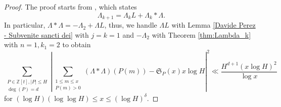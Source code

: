 \documentclass[reqno, 11pt]{amsart}
\numberwithin{equation}{section}
\theoremstyle{definition}
\newcommand{\0}{\mathbf{0}}
\renewcommand{\leq}{\leqslant}
\renewcommand{\P}{\mathbb{P}}
\renewcommand{\leq}{\leqslant}
\renewcommand{\#}{\sharp}
\begin{document}
\begin{proof}The proof starts from \cite[Equation 3.15]{MR2647984}, which states$$ \Lambda_{k+1}=\Lambda_k L+ \Lambda_k \ast \Lambda.$$
In particular, $\Lambda \ast \Lambda=- \Lambda_{2}+\Lambda L$, thus, we handle $\Lambda L$ with 
Lemma \ref{Davide Perez - Subvenite sancti dei} with $j=k=1$ and $- \Lambda_{2}$ with Theorem \ref{thm:Lambda_k} with $n=1,k_1=2$  
to obtain \begin{equation} \label{Abel17} \sum_{\substack{ P\in \mathbb Z[t],|P|\leq H \\  \deg(P)=d}} \left|
\sum_{\substack{1\leq m\leq x\\P(m)>0 } } (\Lambda \ast \Lambda)(P(m)) - \mathfrak S_{P}(x) x  \log H \right|^2  \ll  
\frac{H^{d+1} (x \log H)^2} {\log x}\end{equation}    for $(\log H)(\log \log H) \leq x \leq (\log H)^\delta$.



\end{proof}
\end{document}
